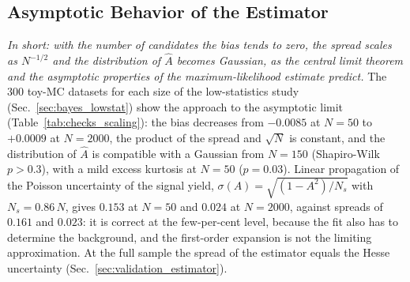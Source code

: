 \subsection{Asymptotic Behavior of the Estimator}
\label{sec:checks_scaling}
\emph{In short: with the number of candidates the bias tends to zero, the spread scales as $N^{-1/2}$ and the distribution of $\hat A$ becomes Gaussian, as the central limit theorem and the asymptotic properties of the maximum-likelihood estimate predict.}
The $300$ toy-MC datasets for each size of the low-statistics study (Sec.~\ref{sec:bayes_lowstat}) show the approach to the asymptotic limit (Table~\ref{tab:checks_scaling}): the bias decreases from $-0.0085$ at $N=50$ to $+0.0009$ at $N=2000$, the product of the spread and $\sqrt N$ is constant, and the distribution of $\hat A$ is compatible with a Gaussian from $N=150$ (Shapiro-Wilk $p>0.3$), with a mild excess kurtosis at $N=50$ ($p=0.03$). Linear propagation of the Poisson uncertainty of the signal yield, $\sigma(A)=\sqrt{(1-A^2)/N_s}$ with $N_s=0.86\,N$, gives $0.153$ at $N=50$ and $0.024$ at $N=2000$, against spreads of $0.161$ and $0.023$: it is correct at the few-per-cent level, because the fit also has to determine the background, and the first-order expansion is not the limiting approximation. At the full sample the spread of the estimator equals the Hesse uncertainty (Sec.~\ref{sec:validation_estimator}).

\begin{table}[h]
\centering
{}
\caption{Distribution of the maximum-likelihood estimate of $A$ in $300$ toy-MC datasets of $N$ candidates (six-parameter model of Sec.~\ref{sec:bayes_minimal}).}
\label{tab:checks_scaling}
\end{table}

